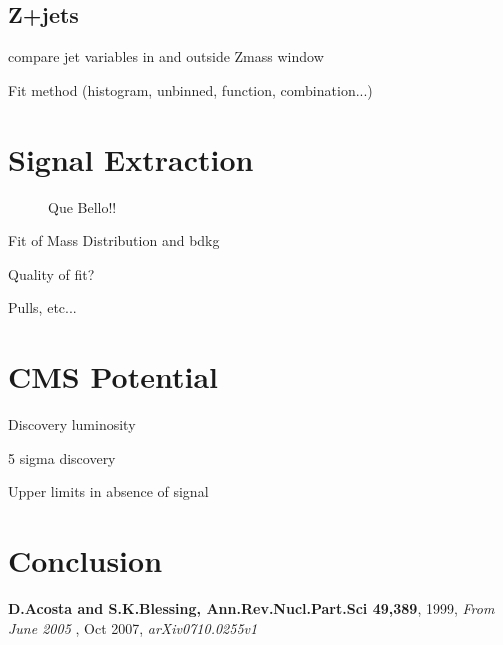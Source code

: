 \documentclass{cmspaper}
\begin{document}
\subsection{Z+jets} 

compare jet variables in and outside Zmass window



Fit method (histogram, unbinned, function, combination...)

\section{Signal Extraction}

 \begin{figure}
   \begin{center}
     \caption{Que Bello!!}
     \label{fig:Mej_allComb}
   \end{center}
 \end{figure}


Fit of Mass Distribution and bdkg

Quality of fit?

Pulls, etc...


\section{CMS Potential}
Discovery luminosity

5 sigma discovery

Upper limits in absence of signal


\section{Conclusion}



\begin{thebibliography}{9}
   {\bf D.Acosta and S.K.Blessing, Ann.Rev.Nucl.Part.Sci 49,389},
    1999,
    {\em From June 2005}
  , Oct 2007,
    {\em arXiv0710.0255v1}
    
 
 
 \end{thebibliography}
 
\end{document}
